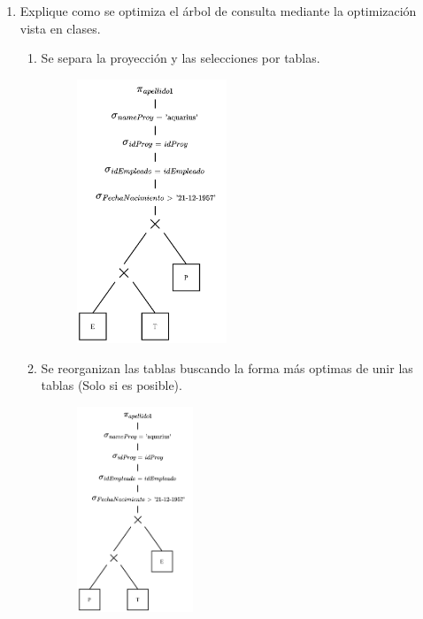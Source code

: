 \documentclass{templateNote}
\begin{document}
\begin{enumerate}
\begin{enumerate}
        \newpage
        \item Explique como se optimiza el árbol de consulta mediante la optimización vista en clases.
        \begin{enumerate}
            \item Se separa la proyección y las selecciones por tablas.
            \begin{figure}[H]
                \centering
                \includegraphics[width=0.45\textwidth]{img/E1-Paso1.png}
            \end{figure}

            \newpage
            \item Se reorganizan las tablas buscando la forma más optimas de unir las tablas (Solo si es posible).
            \begin{figure}[H]
                \centering
                \includegraphics[width=0.35\textwidth]{img/E1-Paso2.png}
            \end{figure}


\end{enumerate}
\end{enumerate}
\end{enumerate}
\end{document}
